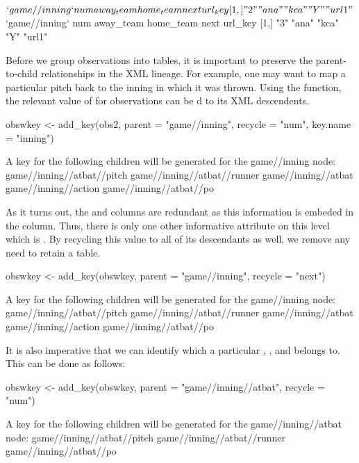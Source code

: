 \begin{article}
\begin{Schunk}
\begin{Soutput}
$`game//inning`
     num away_team home_team next url_key
[1,] "2" "ana"     "kca"     "Y"  "url1" 

$`game//inning`
     num away_team home_team next url_key
[1,] "3" "ana"     "kca"     "Y"  "url1" 
\end{Soutput}
\end{Schunk}
%
Before we group observations into tables, it is important to preserve
the parent-to-child relationships in the XML lineage. For example,
one may want to map a particular pitch back to the inning in which
it was thrown. Using the  function, the relevant value
of  for  observations can be d
to its XML descendents.
%
\begin{Schunk}
\begin{Sinput}
obswkey <- add_key(obs2, parent = "game//inning", recycle = "num", key.name = "inning")
\end{Sinput}
\begin{Soutput}
A key for the following children will be generated for the game//inning node:
game//inning//atbat//pitch
game//inning//atbat//runner
game//inning//atbat
game//inning//action
game//inning//atbat//po
\end{Soutput}
\end{Schunk}
%
As it turns out, the  and  columns
are redundant as this information is embeded in the  column.
Thus, there is only one other informative attribute on this level
which is . By recycling this value to all of its descendants
as well, we remove any need to retain a  table.
%
\begin{Schunk}
\begin{Sinput}
obswkey <- add_key(obswkey, parent = "game//inning", recycle = "next")
\end{Sinput}
\begin{Soutput}
A key for the following children will be generated for the game//inning node:
game//inning//atbat//pitch
game//inning//atbat//runner
game//inning//atbat
game//inning//action
game//inning//atbat//po
\end{Soutput}
\end{Schunk}
%
It is also imperative that we can identify which  a particular
, , and  belongs to. This can
be done as follows:
%
\begin{Schunk}
\begin{Sinput}
obswkey <- add_key(obswkey, parent = "game//inning//atbat", recycle = "num")
\end{Sinput}
\begin{Soutput}
A key for the following children will be generated for the game//inning//atbat node:
game//inning//atbat//pitch
game//inning//atbat//runner
game//inning//atbat//po
\end{Soutput}
\end{Schunk}


\end{article}
